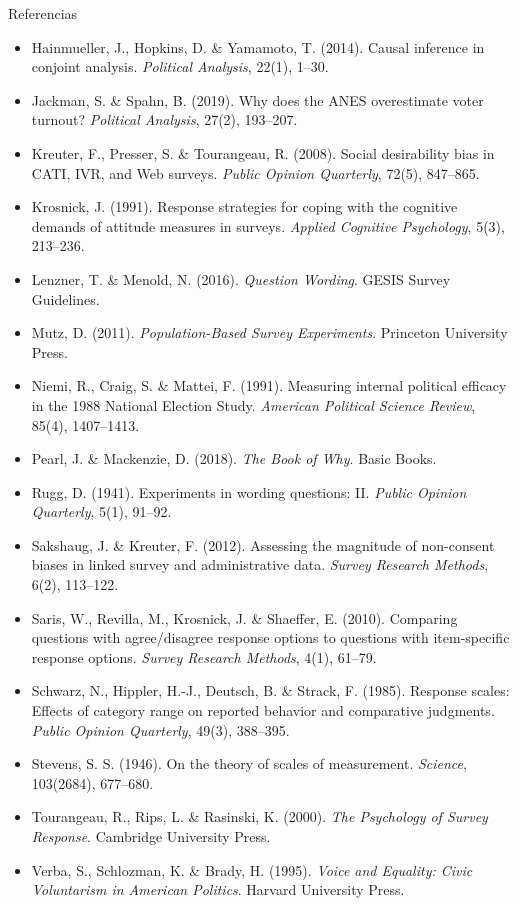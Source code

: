 \documentclass[aspectratio=169,11pt]{beamer}
\begin{document}
\begin{frame}[allowframebreaks]{Referencias}
\begin{itemize}
\item[] Hainmueller, J., Hopkins, D. \& Yamamoto, T. (2014). Causal inference in conjoint analysis. \emph{Political Analysis}, 22(1), 1--30.
\item[] Jackman, S. \& Spahn, B. (2019). Why does the ANES overestimate voter turnout? \emph{Political Analysis}, 27(2), 193--207.
\item[] Kreuter, F., Presser, S. \& Tourangeau, R. (2008). Social desirability bias in CATI, IVR, and Web surveys. \emph{Public Opinion Quarterly}, 72(5), 847--865.
\item[] Krosnick, J. (1991). Response strategies for coping with the cognitive demands of attitude measures in surveys. \emph{Applied Cognitive Psychology}, 5(3), 213--236.
\item[] Lenzner, T. \& Menold, N. (2016). \emph{Question Wording}. GESIS Survey Guidelines.
\item[] Mutz, D. (2011). \emph{Population-Based Survey Experiments}. Princeton University Press.
\item[] Niemi, R., Craig, S. \& Mattei, F. (1991). Measuring internal political efficacy in the 1988 National Election Study. \emph{American Political Science Review}, 85(4), 1407--1413.
\item[] Pearl, J. \& Mackenzie, D. (2018). \emph{The Book of Why}. Basic Books.
\item[] Rugg, D. (1941). Experiments in wording questions: II. \emph{Public Opinion Quarterly}, 5(1), 91--92.
\item[] Sakshaug, J. \& Kreuter, F. (2012). Assessing the magnitude of non-consent biases in linked survey and administrative data. \emph{Survey Research Methods}, 6(2), 113--122.
\item[] Saris, W., Revilla, M., Krosnick, J. \& Shaeffer, E. (2010). Comparing questions with agree/disagree response options to questions with item-specific response options. \emph{Survey Research Methods}, 4(1), 61--79.
\item[] Schwarz, N., Hippler, H.-J., Deutsch, B. \& Strack, F. (1985). Response scales: Effects of category range on reported behavior and comparative judgments. \emph{Public Opinion Quarterly}, 49(3), 388--395.
\item[] Stevens, S. S. (1946). On the theory of scales of measurement. \emph{Science}, 103(2684), 677--680.
\item[] Tourangeau, R., Rips, L. \& Rasinski, K. (2000). \emph{The Psychology of Survey Response}. Cambridge University Press.
\item[] Verba, S., Schlozman, K. \& Brady, H. (1995). \emph{Voice and Equality: Civic Voluntarism in American Politics}. Harvard University Press.
\end{itemize}
\end{frame}
\end{document}
